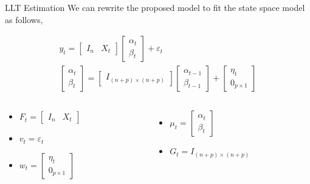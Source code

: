 \documentclass[
  ignorenonframetext,
]{beamer}
\begin{document}
\begin{frame}{LLT Estimation}
\protect\hypertarget{llt-estimation}{}
We can rewrite the proposed model to fit the state space model as
follows,

\begin{align*}
y_t = 
\begin{bmatrix}
I_n & X_t
\end{bmatrix}
\begin{bmatrix}
\alpha_t\\
\beta_t
\end{bmatrix}
+ \varepsilon_t\\
\begin{bmatrix}
\alpha_t\\
\beta_t
\end{bmatrix} = 
\begin{bmatrix}
I_{(n+p) \times (n+p)}
\end{bmatrix}
\begin{bmatrix}
\alpha_{t-1}\\
\beta_{t-1}
\end{bmatrix} + 
\begin{bmatrix}
\eta_t \\
0_{p \times 1}
\end{bmatrix}
\end{align*}

\begin{columns}
\begin{column}{0.35\textwidth}
\begin{itemize}
\item $F_t = \begin{bmatrix}I_n & X_t\end{bmatrix}$
\item $v_t = \varepsilon_t$
\item $w_t = \begin{bmatrix} \eta_t \\ 0_{p\times1} \end{bmatrix}$
\end{itemize}
\end{column}
\begin{column}{0.35\textwidth}
\begin{itemize}
\item $\mu_t = \begin{bmatrix}\alpha_t \\ \beta_t\end{bmatrix}$
\item $G_t = I_{(n+p) \times (n+p)}$
\end{itemize}
\end{column}
\end{columns}
\end{frame}
\end{document}
